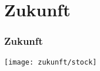 \section{Zukunft}
\begin{frameplain}
	\frametitle{Zukunft}
	\texttt{[image: zukunft/stock]}
\end{frameplain}
